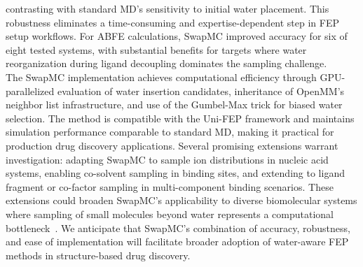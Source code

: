 \documentclass[journal=jacsat,manuscript=article]{achemso}
\begin{document}
contrasting with standard MD's sensitivity to initial water placement. 
This robustness eliminates a time-consuming and expertise-dependent step in FEP setup workflows. 
For ABFE calculations, SwapMC improved accuracy for six of eight tested systems, with substantial benefits for targets where water reorganization during ligand decoupling dominates the sampling challenge.\\
\newline
The SwapMC implementation achieves computational efficiency through GPU-parallelized evaluation of water insertion candidates, 
inheritance of OpenMM's neighbor list infrastructure, and use of the Gumbel-Max trick for biased water selection. 
The method is compatible with the Uni-FEP framework and maintains simulation performance comparable to standard MD, making it practical for production drug discovery applications. 
Several promising extensions warrant investigation: adapting SwapMC to sample ion distributions in nucleic acid systems, enabling co-solvent sampling in binding sites, and extending to ligand fragment or co-factor sampling in multi-component binding scenarios. 
These extensions could broaden SwapMC's applicability to diverse biomolecular systems where sampling of small molecules beyond water represents a computational bottleneck~\cite{Cezar2020,goel2021rapid}. 
We anticipate that SwapMC's combination of accuracy, robustness, and ease of implementation will facilitate broader adoption of water-aware FEP methods in structure-based drug discovery.

\end{document}
